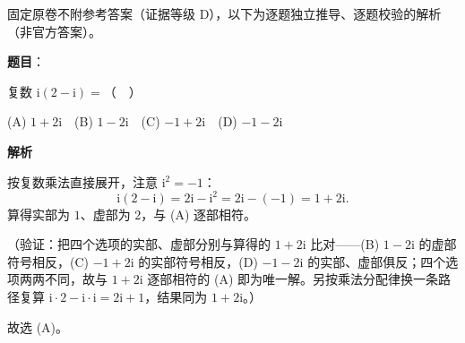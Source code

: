 
\begin{gktip}
固定原卷不附参考答案（证据等级 D），以下为逐题独立推导、逐题校验的解析（非官方答案）。
\end{gktip}

\begin{answer}

\textbf{题目}：

复数 \(\mathrm{i}(2-\mathrm{i})=\)（　）

(A) \(1+2\mathrm{i}\)　(B) \(1-2\mathrm{i}\)　(C) \(-1+2\mathrm{i}\)　(D) \(-1-2\mathrm{i}\)

\textbf{解析}

按复数乘法直接展开，注意 \(\mathrm{i}^{2}=-1\)：
\nopagebreak[4]
\[
\mathrm{i}(2-\mathrm{i})=2\mathrm{i}-\mathrm{i}^{2}=2\mathrm{i}-(-1)=1+2\mathrm{i}.
\]
算得实部为 \(1\)、虚部为 \(2\)，与 (A) 逐部相符。

（验证：把四个选项的实部、虚部分别与算得的 \(1+2\mathrm{i}\) 比对——(B) \(1-2\mathrm{i}\) 的虚部符号相反，(C) \(-1+2\mathrm{i}\) 的实部符号相反，(D) \(-1-2\mathrm{i}\) 的实部、虚部俱反；四个选项两两不同，故与 \(1+2\mathrm{i}\) 逐部相符的 (A) 即为唯一解。另按乘法分配律换一条路径复算 \(\mathrm{i}\cdot2-\mathrm{i}\cdot\mathrm{i}=2\mathrm{i}+1\)，结果同为 \(1+2\mathrm{i}\)。）

故选 (A)。


\end{answer}
